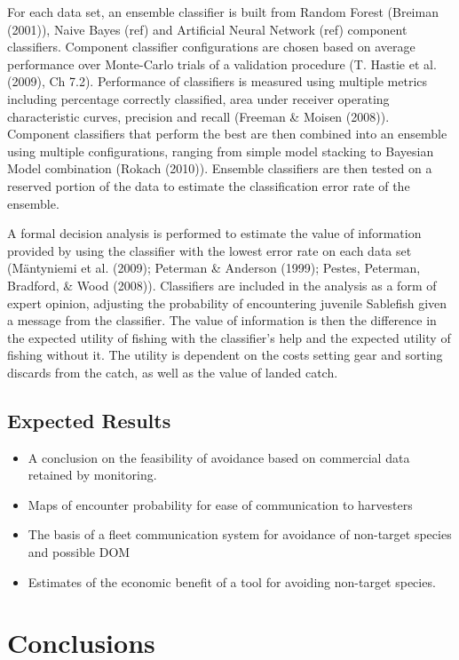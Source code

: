 \documentclass[12pt,]{scrartcl}
\providecommand{\tightlist}{%
  \setlength{\itemsep}{0pt}\setlength{\parskip}{0pt}}
\begin{document}
For each data set, an ensemble classifier is built from Random Forest
(Breiman (2001)), Naive Bayes (ref) and Artificial Neural Network (ref)
component classifiers. Component classifier configurations are chosen
based on average performance over Monte-Carlo trials of a validation
procedure (T. Hastie et al. (2009), Ch 7.2). Performance of classifiers
is measured using multiple metrics including percentage correctly
classified, area under receiver operating characteristic curves,
precision and recall (Freeman \& Moisen (2008)). Component classifiers
that perform the best are then combined into an ensemble using multiple
configurations, ranging from simple model stacking to Bayesian Model
combination (Rokach (2010)). Ensemble classifiers are then tested on a
reserved portion of the data to estimate the classification error rate
of the ensemble.

A formal decision analysis is performed to estimate the value of
information provided by using the classifier with the lowest error rate
on each data set (Mäntyniemi et al. (2009); Peterman \& Anderson (1999);
Pestes, Peterman, Bradford, \& Wood (2008)). Classifiers are included in
the analysis as a form of expert opinion, adjusting the probability of
encountering juvenile Sablefish given a message from the classifier. The
value of information is then the difference in the expected utility of
fishing with the classifier's help and the expected utility of fishing
without it. The utility is dependent on the costs setting gear and
sorting discards from the catch, as well as the value of landed catch.

\subsection{Expected Results}\label{expected-results-3}

\begin{itemize}
\tightlist
\item
  A conclusion on the feasibility of avoidance based on commercial data
  retained by monitoring.
\item
  Maps of encounter probability for ease of communication to harvesters
\item
  The basis of a fleet communication system for avoidance of non-target
  species and possible DOM
\item
  Estimates of the economic benefit of a tool for avoiding non-target
  species.
\end{itemize}

\section{Conclusions}\label{conclusions}
\end{document}
